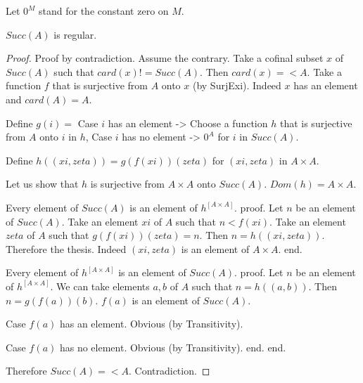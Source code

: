 \documentclass{article}
\newcommand{\Prod}[2]{#1\times #2}
\begin{document}
\begin{forthel}
    Let $0^M$ stand for the constant zero on $M$.

    \begin{theorem}
      $Succ(A)$ is regular.
    \end{theorem}
    \begin{proof}
      Proof by contradiction. Assume the contrary. Take a cofinal subset $x$ of
      $Succ(A)$ such that $card(x) != Succ(A)$. Then $card(x) =< A$. Take a function $f$ that is surjective from $A$ onto $x$ (by SurjExi). Indeed $x$ has an element and $card(A) = A$.

      Define $g(i) =$
        Case $i$ has an element -> Choose a function $h$ that is surjective from $A$ onto $i$ in $h$,
        Case $i$ has no element -> $0^A$
      for $i$ in $Succ(A)$.

      Define $h((xi,zeta)) = g(f(xi))(zeta)$ for $(xi,zeta)$ in $\Prod{A}{A}$.

      Let us show that $h$ is surjective from $\Prod{A}{A}$ onto $Succ(A)$. $Dom(h) = \Prod{A}{A}$.

        Every element of $Succ(A)$ is an element of $h^[\Prod{A}{A}]$.
        proof.
          Let $n$ be an element of $Succ(A)$. Take an element $xi$ of $A$ such that $n < f(xi)$. Take an element $zeta$ of $A$ such that $g(f(xi))(zeta) = n$. Then $n = h((xi,zeta))$. Therefore the thesis. Indeed $(xi,zeta)$ is an element of $\Prod{A}{A}$.
        end.

        Every element of $h^[\Prod{A}{A}]$ is an element of $Succ(A)$.
        proof.
          Let $n$ be an element of $h^[\Prod{A}{A}]$. We can take elements $a,b$ of $A$ such that $n = h((a,b))$. Then $n = g(f(a))(b)$. $f(a)$ is an element of $Succ(A)$.

          Case $f(a)$ has an element. Obvious (by Transitivity).

          Case $f(a)$ has no element. Obvious (by Transitivity).
        end.
      end.

      Therefore $Succ(A) =< A$. Contradiction.
    \end{proof}
  \end{forthel}
\end{document}
